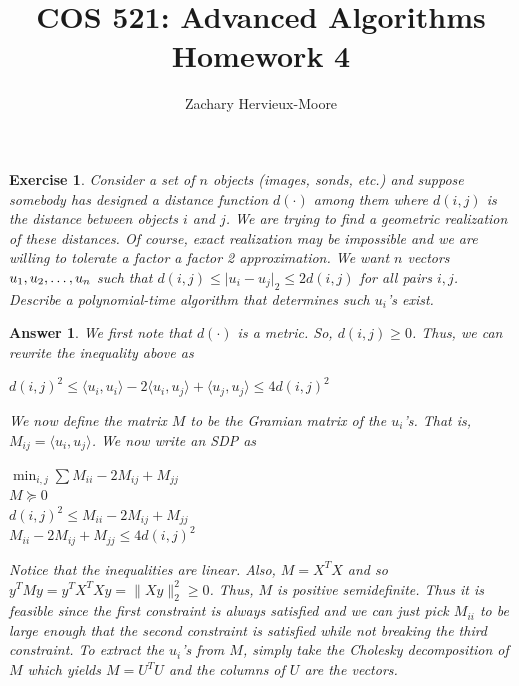 \documentclass[12pt]{article}
\title{COS 521: Advanced Algorithms \\ Homework 4}
\author{Zachary Hervieux-Moore}
\date{\displaydate{date}}
\theoremstyle{colon}
\newtheorem{exercise}{Exercise}
\newtheorem*{answer}{Answer}
\begin{document}
\maketitle

\clearpage

\begin{exercise}
  Consider a set of $n$ objects (images, sonds, etc.) and suppose somebody has designed a \textit{distance} function $d(\cdot)$ among them where $d(i,j)$ is the distance between objects $i$ and $j$. We are trying to find a geometric realization of these distances. Of course, exact realization may be impossible and we are willing to tolerate a factor a factor 2 approximation. We want $n$ vectors $u_1, u_2, \mathellipsis, u_n$ such that $d(i,j) \leq \lvert u_i - u_j \rvert_2 \leq 2 d(i,j)$ for all pairs $i, j$. Describe a polynomial-time algorithm that determines such $u_i$'s exist.
\end{exercise}

\begin{answer}
  We first note that $d(\cdot)$ is a metric. So, $d(i,j) \geq 0$. Thus, we can rewrite the inequality above as
  \begin{center}
    $d(i,j)^2 \leq \langle u_i, u_i \rangle - 2\langle u_i, u_j \rangle + \langle u_j, u_j \rangle \leq 4d(i,j)^2$
  \end{center}

  We now define the matrix $M$ to be the Gramian matrix of the $u_i$'s. That is, $M_{ij} = \langle u_i, u_j \rangle$. We now write an SDP as

  \begin{center}
    $\min_{i,j} \sum M_{ii} - 2M_{ij} + M_{jj}$ \\
    $M \succeq 0$ \\
    $d(i,j)^2 \leq M_{ii} - 2M_{ij} + M_{jj}$ \\
    $M_{ii} - 2M_{ij} + M_{jj} \leq 4 d(i,j)^2$
  \end{center}

  Notice that the inequalities are linear. Also, $M = X^T X$ and so $y^T M y = y^T X^T X y = \lVert X y \rVert_2^2 \geq 0$. Thus, $M$ is positive semidefinite. Thus it is feasible since the first constraint is always satisfied and we can just pick $M_{ii}$ to be large enough that the second constraint is satisfied while not breaking the third constraint. To extract the $u_i$'s from $M$, simply take the Cholesky decomposition of $M$ which yields $M = U^T U$ and the columns of $U$ are the vectors.
\end{answer}
\end{document}
